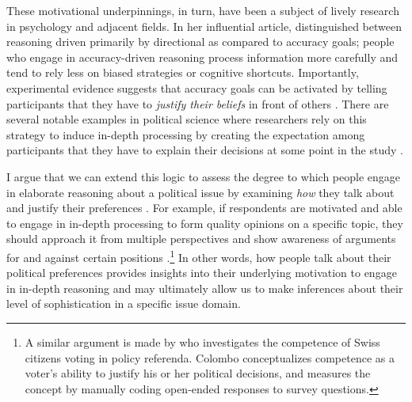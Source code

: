 These motivational underpinnings, in turn, have been a subject of lively research in psychology and adjacent fields. In her influential article, \citet{kunda1990case} distinguished between reasoning driven primarily by directional as compared to accuracy goals; people who engage in accuracy-driven reasoning process information more carefully and tend to rely less on biased strategies or cognitive shortcuts. Importantly, experimental evidence suggests that accuracy goals can be activated by telling participants that they have to \textit{justify their beliefs} in front of others \citep{kunda1990case}. There are several notable examples in political science where researchers rely on this strategy to induce in-depth processing by creating the expectation among participants that they have to explain their decisions at some point in the study \citep[e.g.,][]{tetlock1983accountability,redlawsk2002hot,eveland2004effect,bolsen2014influence}.

I argue that we can extend this logic to assess the degree to which people engage in elaborate reasoning about a political issue by examining \textit{how} they talk about and justify their preferences \citep[see also][]{rosenberg1988structure,rosenberg1988political}. For example, if respondents are motivated and able to engage in in-depth processing to form quality opinions on a specific topic, they should approach it from multiple perspectives and show awareness of arguments for and against certain positions \citep{cappella2002argument}.\footnote{A similar argument is made by \citet{colombo2016justifications} who investigates the competence of Swiss citizens voting in policy referenda. Colombo conceptualizes competence as a voter's ability to justify his or her political decisions, and measures the concept by manually coding open-ended responses to survey questions.} In other words, how people talk about their political preferences provides insights into their underlying motivation to engage in in-depth reasoning and may ultimately allow us to make inferences about their level of sophistication in a specific issue domain.

